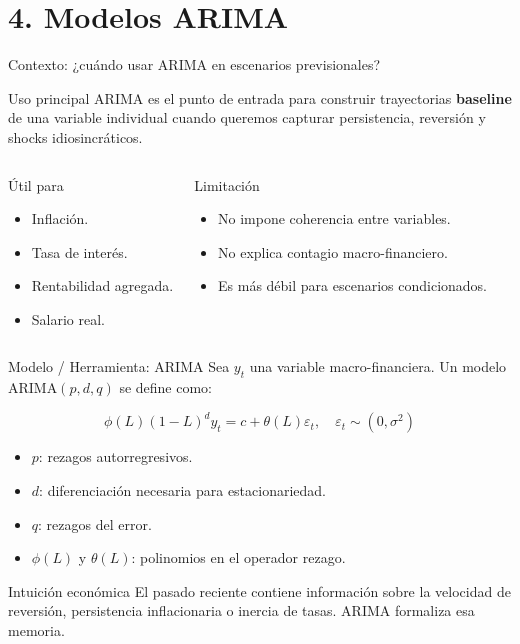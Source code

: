 \documentclass[10pt,aspectratio=169]{beamer}
\newcommand{\baseline}{\textcolor{MacropolTeal}{\textbf{baseline}}}
\begin{document}
\section{4. Modelos ARIMA}

\begin{frame}{Contexto: ¿cuándo usar ARIMA en escenarios previsionales?}
\begin{block}{Uso principal}
ARIMA es el punto de entrada para construir trayectorias \baseline{} de una variable individual cuando queremos capturar persistencia, reversión y shocks idiosincráticos.
\end{block}

\begin{columns}
\begin{block}{Útil para}
\begin{itemize}
  \item Inflación.
  \item Tasa de interés.
  \item Rentabilidad agregada.
  \item Salario real.
\end{itemize}
\end{block}

\begin{block}{Limitación}
\begin{itemize}
  \item No impone coherencia entre variables.
  \item No explica contagio macro-financiero.
  \item Es más débil para escenarios condicionados.
\end{itemize}
\end{block}
\end{columns}
\end{frame}

\begin{frame}{Modelo / Herramienta: ARIMA}
Sea $y_t$ una variable macro-financiera. Un modelo ARIMA$(p,d,q)$ se define como:

\[
\phi(L)(1-L)^d y_t = c + \theta(L)\varepsilon_t,
\quad \varepsilon_t \sim (0,\sigma^2)
\]

\begin{itemize}
  \item $p$: rezagos autorregresivos.
  \item $d$: diferenciación necesaria para estacionariedad.
  \item $q$: rezagos del error.
  \item $\phi(L)$ y $\theta(L)$: polinomios en el operador rezago.
\end{itemize}

\begin{block}{Intuición económica}
El pasado reciente contiene información sobre la velocidad de reversión, persistencia inflacionaria o inercia de tasas. ARIMA formaliza esa memoria.
\end{block}
\end{frame}
\end{document}
